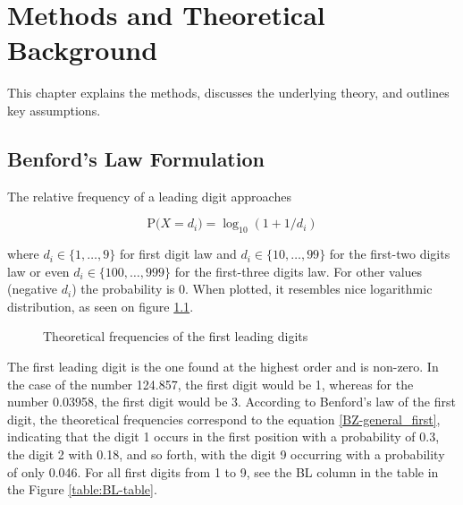 \chapter{Methods and Theoretical Background}

This chapter explains the methods, discusses the underlying theory, and outlines key assumptions. 

\section{Benford's Law Formulation}

The relative frequency of a leading digit approaches 

\begin{equation}
    \label{BZ-general_first}
\text{P(} X = d_i\text{)}= \log_{10}(1+1/d_i)
\end{equation}

where $d_i \in \{1,\dots,9\}$ for first digit law and $d_i \in \{10,\dots,99\}$ for the first-two digits law or even $d_i \in \{100,\dots,999\}$ for the first-three digits law. For other values (negative $d_i$) the probability is 0. When plotted, it resembles nice logarithmic distribution, as seen on figure \ref{fig:FL}.  \cite{Cerqueti2202,Hronova2023,Newcomb1881}

\begin{figure}[h]
    \centering
    \caption{Theoretical frequencies of the first leading digits}
    \label{fig:FL}
    \pgfplotsset{width=8.5cm,compat=1.18}
\end{figure}

The first leading digit is the one found at the highest order and is non-zero. In the case of the number 124.857, the first digit would be 1, whereas for the number 0.03958, the first digit would be 3. According to Benford's law of the first digit, the theoretical frequencies correspond to the equation \ref{BZ-general_first}, indicating that the digit 1 occurs in the first position with a probability of 0.3, the digit 2 with 0.18, and so forth, with the digit 9 occurring with a probability of only 0.046. For all first digits from 1 to 9, see the BL column in the table in the Figure \ref{table:BL-table}.

